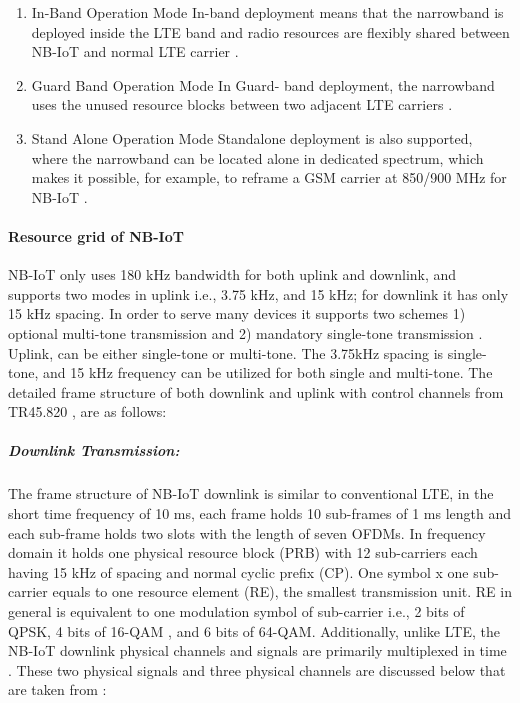 \documentclass[12pt]{article}
\begin{document}
\begin{enumerate}
    \item In-Band Operation Mode\newline
    In-band deployment means that the narrowband is deployed inside the LTE band and radio resources are flexibly shared between NB-IoT and normal LTE carrier \cite{farrell2018low}.
    \item  Guard Band Operation Mode\newline
    In Guard- band deployment, the narrowband uses the unused resource blocks between two adjacent LTE carriers \cite{farrell2018low}.
    \item Stand Alone Operation Mode\newline
    Standalone deployment is also supported, where the narrowband can be located alone in dedicated spectrum, which makes it possible, for example, to reframe a GSM carrier at 850/900 MHz for NB-IoT \cite{farrell2018low}.
\end{enumerate}

\paragraph{Resource grid of NB-IoT} \label{repetition}
NB-IoT only uses 180 kHz bandwidth for both uplink and downlink, and supports two modes in uplink i.e., 3.75 kHz, and 15 kHz; for downlink it has only 15 kHz spacing. In order to serve many devices it supports two schemes 1) optional multi-tone transmission and 2) mandatory single-tone transmission \cite{xu2017narrowband,malik2018radio}. Uplink, can be either single-tone or multi-tone. The 3.75kHz spacing is single-tone, and 15 kHz frequency can be utilized for both single and multi-tone. The detailed frame structure of both downlink and uplink with control channels from TR45.820 \cite{malik2018radio,TR45.820}, are as follows:

\subparagraph{Downlink Transmission:}
The frame structure of NB-IoT downlink is similar to conventional LTE, in the short time frequency of 10 ms, each frame holds 10 sub-frames of 1 ms length and each sub-frame holds two slots with the length of seven OFDMs. In frequency domain it holds one physical resource block (PRB) with 12 sub-carriers each having 15 kHz of spacing and normal cyclic prefix (CP). One symbol x one sub-carrier equals to one resource element (RE), the smallest transmission unit. RE in general is equivalent to one modulation symbol of sub-carrier i.e., 2 bits of QPSK, 4 bits of 16-QAM , and 6 bits of 64-QAM. Additionally, unlike LTE, the NB-IoT downlink physical channels and signals are primarily multiplexed in time \cite{malik2018radio}. These two physical signals and three physical channels are discussed below that are taken from  \cite{malik2018radio,ratasuk2016overview}:
\end{document}
